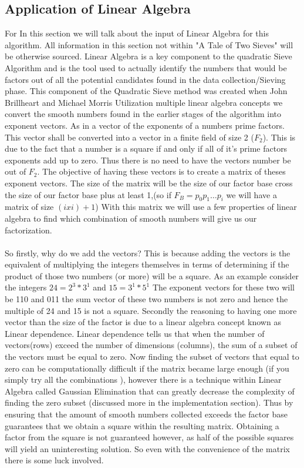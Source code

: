 \documentclass[12pt]{article} %
\begin{document}
\subsection{Application of Linear Algebra}
\indent For In this section we will talk about the input of Linear Algebra for this algorithm. All information in this section not within "A Tale of Two Sieves" will be otherwise sourced. Linear Algebra is a key component to the quadratic Sieve Algorithm and is the tool used to actually identify the numbers that would be factors out of all the potential candidates found in the data collection/Sieving phase. This component of the Quadratic Sieve method was created when John Brillheart and Michael Morris Utilization multiple linear algebra concepts we convert the smooth numbers found in the earlier stages of the algorithm into exponent vectors. As in a vector of the exponents of a numbers prime factors. This vector shall be converted into a vector in a finite field of size 2 ($F_2$). This is due to the fact that a number is a square if and only if all of it's prime factors exponents add up to zero. Thus there is no need to have the vectors number be out of $F_2$. The objective of having these vectors is to create a matrix of theses exponent vectors. The size of the matrix will be the size of our factor base cross the size of our factor base plus at least 1,(so if $F_B = p_0p_1\dots p_i$ we will have a matrix of size $(ixi)+1$) With this matrix we will use a few properties of linear algebra to find which combination of smooth numbers will give us our factorization. 
\\\\
\indent So firstly, why do we add the vectors? This is because adding the vectors is the equivalent of multiplying the integers themselves in terms of determining if the product of those two numbers (or more) will be a square. As an example consider the integers $24 = 2^{3}*3^{1}$ and $15 = 3^{1}*5^{1} $ The exponent vectors for these two will be 110 and 011 the sum vector of these two numbers is not zero and hence the multiple of 24 and 15 is not a square. Secondly the reasoning to having one more vector than the size of the factor is due to a linear algebra concept known as Linear dependence. Linear dependence tells us that when the number of vectors(rows) exceed the number of dimensions (columns), the sum of a subset of the vectors must be equal to zero. Now finding the subset of vectors that equal to zero can be computationally difficult if the matrix became large enough (if you simply try all the combinations ), however there is a technique within Linear Algebra called Gaussian Elimination that can greatly decrease the complexity of finding the zero subset (discussed more in the implementation section). Thus by ensuring that the amount of smooth numbers collected exceeds the factor base guarantees that we obtain a square within the resulting matrix. Obtaining a factor from the square is not guaranteed however, as half of the possible squares will yield an uninteresting solution. So even with the convenience of the matrix there is some luck involved.
\end{document}
